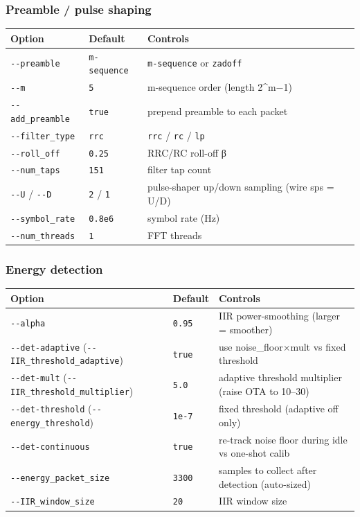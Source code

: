 \documentclass[
  10pt,
]{article}
\begin{document}
\hypertarget{preamble--pulse-shaping}{%
\subsubsection{Preamble / pulse shaping}\label{preamble--pulse-shaping}}

\begin{longtable}[]{@{}lll@{}}
\toprule
Option & Default & Controls \\
\midrule
\endhead
\texttt{-\/-preamble} & \texttt{m-sequence} & \texttt{m-sequence} or
\texttt{zadoff} \\
\texttt{-\/-m} & \texttt{5} & m-sequence order (length 2\^{}m−1) \\
\texttt{-\/-add\_preamble} & \texttt{true} & prepend preamble to each
packet \\
\texttt{-\/-filter\_type} & \texttt{rrc} & \texttt{rrc} / \texttt{rc} /
\texttt{lp} \\
\texttt{-\/-roll\_off} & \texttt{0.25} & RRC/RC roll-off β \\
\texttt{-\/-num\_taps} & \texttt{151} & filter tap count \\
\texttt{-\/-U} / \texttt{-\/-D} & \texttt{2} / \texttt{1} & pulse-shaper
up/down sampling (wire sps = U/D) \\
\texttt{-\/-symbol\_rate} & \texttt{0.8e6} & symbol rate (Hz) \\
\texttt{-\/-num\_threads} & \texttt{1} & FFT threads \\
\bottomrule
\end{longtable}

\hypertarget{energy-detection}{%
\subsubsection{Energy detection}\label{energy-detection}}

\begin{longtable}[]{@{}lll@{}}
\toprule
Option & Default & Controls \\
\midrule
\endhead
\texttt{-\/-alpha} & \texttt{0.95} & IIR power-smoothing (larger =
smoother) \\
\texttt{-\/-det-adaptive} (\texttt{-\/-IIR\_threshold\_adaptive}) &
\texttt{true} & use noise\_floor×mult vs fixed threshold \\
\texttt{-\/-det-mult} (\texttt{-\/-IIR\_threshold\_multiplier}) &
\texttt{5.0} & adaptive threshold multiplier (raise OTA to 10--30) \\
\texttt{-\/-det-threshold} (\texttt{-\/-energy\_threshold}) &
\texttt{1e-7} & fixed threshold (adaptive off only) \\
\texttt{-\/-det-continuous} & \texttt{true} & re-track noise floor
during idle vs one-shot calib \\
\texttt{-\/-energy\_packet\_size} & \texttt{3300} & samples to collect
after detection (auto-sized) \\
\texttt{-\/-IIR\_window\_size} & \texttt{20} & IIR window size \\
\bottomrule
\end{longtable}
\end{document}
